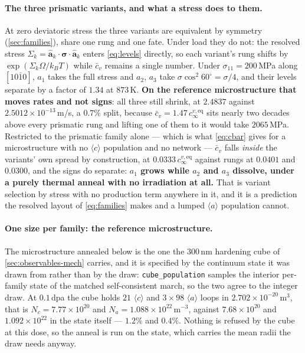 \documentclass{article}
\newcommand{\aloop}{\ensuremath{\langle a\rangle}}
\newcommand{\cloop}{\ensuremath{\langle c\rangle}}
\newcommand{\code}[1]{\texttt{#1}}
\begin{document}
\paragraph{The three prismatic variants, and what a stress does to them.} At zero
deviatoric stress the three variants are equivalent by symmetry
(\cref{sec:families}), share one rung and one fate. Under load they do not: the
resolved stress $\Sigma_k=\hat{\bm a}_k\cdot\bm\sigma\cdot\hat{\bm a}_k$ enters
\cref{eq:levels} directly, so each variant's rung shifts by
$\exp(\Sigma_k\Omega/k_BT)$ while $\bar c_v$ remains a single number. Under
$\sigma_{11}=200\,$MPa along $[10\bar10]$, $a_1$ takes the full stress and $a_2$,
$a_3$ take $\sigma\cos^2 60^\circ=\sigma/4$, and their levels separate by a
factor of $1.34$ at $873\,$K. \textbf{On the reference microstructure that moves
rates and not signs}: all three still shrink, at $2.4837$ against
$2.5012\times10^{-13}\,$m/s, a $0.7\%$ split, because $\bar c_v=1.47\,
c^{v,\mathrm{eq}}_\infty$ sits nearly two decades above every prismatic rung and
lifting one of them to it would take $2065\,$MPa. Restricted to the prismatic
family alone --- which is what \cref{eq:cbar} gives for a microstructure with no
\cloop{} population and no network --- $\bar c_v$ falls \emph{inside} the
variants' own spread by construction, at $0.0333\,c^{v,\mathrm{eq}}_\infty$
against rungs at $0.0401$ and $0.0300$, and the signs do separate:
\textbf{$a_1$ grows while $a_2$ and $a_3$ dissolve, under a purely thermal
anneal with no irradiation at all.} That is variant selection by stress with no
production term anywhere in it, and it is a prediction the resolved layout of
\cref{eq:families} makes and a lumped \aloop{} population cannot.

\paragraph{One size per family: the reference microstructure.} The
microstructure annealed below is the one the $300\,$nm hardening cube of
\cref{sec:observables-mech} carries, and it is specified by the continuum state it was
drawn from rather than by the draw: \code{cube\_population} samples the interior
per-family state of the matched self-consistent march, so the two agree to the
integer draw. At $0.1\,$dpa the cube holds $21$ \cloop{} and $3\times98$
\aloop{} loops in $2.702\times10^{-20}\,$m$^3$, that is
$N_c=7.77\times10^{20}$ and $N_a=1.088\times10^{22}\,$m$^{-3}$, against
$7.68\times10^{20}$ and $1.092\times10^{22}$ in the state itself --- $1.2\%$ and
$0.4\%$. Nothing is refused by the cube at this dose, so the anneal is run on the
state, which carries the mean radii the draw needs anyway.
\end{document}
